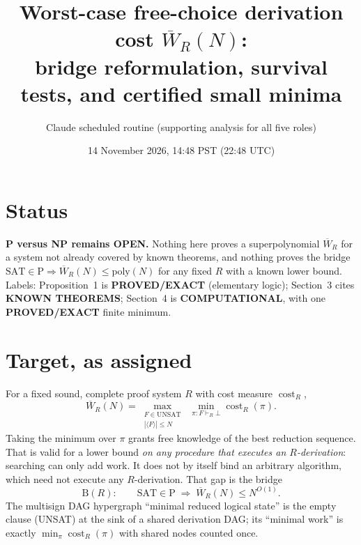 \documentclass[11pt]{article}
\title{Worst-case free-choice derivation cost $\overline W_R(N)$:\\
bridge reformulation, survival tests, and certified small minima}
\author{Claude scheduled routine (supporting analysis for all five roles)}
\date{14 November 2026, 14:48 PST (22:48 UTC)}
\begin{document}
\maketitle

\section*{Status}
\textbf{P versus NP remains OPEN.} Nothing here proves a superpolynomial
$\overline W_R$ for a system not already covered by known theorems, and
nothing proves the bridge $\mathrm{SAT}\in\mathrm P\Rightarrow
\overline W_R(N)\le\mathrm{poly}(N)$ for any fixed $R$ with a known lower bound.
Labels: Proposition~1 is \textbf{PROVED/EXACT} (elementary logic);
Section~3 cites \textbf{KNOWN THEOREMS}; Section~4 is \textbf{COMPUTATIONAL},
with one \textbf{PROVED/EXACT} finite minimum.

\section{Target, as assigned}
For a fixed sound, complete proof system $R$ with cost measure $\operatorname{cost}_R$,
\[
\overline W_R(N)=\max_{\substack{F\in\mathrm{UNSAT}\\|\langle F\rangle|\le N}}\;
\min_{\pi:F\vdash_R\bot}\operatorname{cost}_R(\pi).
\]
Taking the minimum over $\pi$ grants free knowledge of the best reduction
sequence. That is valid for a lower bound \emph{on any procedure that
executes an $R$-derivation}: searching can only add work. It does not by
itself bind an arbitrary algorithm, which need not execute any
$R$-derivation. That gap is the bridge
\[
\mathrm{B}(R):\qquad \mathrm{SAT}\in\mathrm P\;\Longrightarrow\;\overline W_R(N)\le N^{O(1)}.
\]
The multisign DAG hypergraph ``minimal reduced logical state'' is the empty
clause (UNSAT) at the sink of a shared derivation DAG; its ``minimal work'' is
exactly $\min_\pi\operatorname{cost}_R(\pi)$ with shared nodes counted once.
\end{document}
